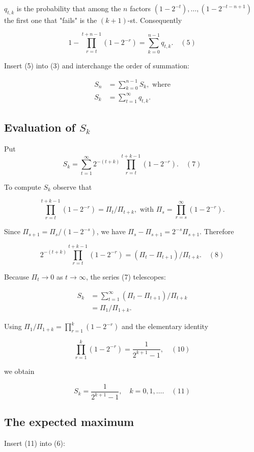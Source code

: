 \documentclass[12pt,a4paper]{article}
\theoremstyle{definition}
\begin{document}
$q_{t,k}$ is the probability that among the $n$ factors $(1 - 2^{-t}), \ldots, (1 - 2^{-t-n+1})$ the first one that "fails" is the $(k+1)$-st.
Consequently

\[
1 - \prod_{r=t}^{t+n-1}(1 - 2^{-r}) = \sum_{k=0}^{n-1} q_{t,k}. \quad {(5)}
\]

Insert (5) into (3) and interchange the order of summation:

\begin{align}
S_n &= \sum_{k=0}^{n-1} S_k, \text{ where} \\
S_k &= \sum_{t=1}^{\infty} q_{t,k}. \tag{6}
\end{align}

\subsection*{Evaluation of $S_k$}

Put
\[
S_k = \sum_{t=1}^{\infty} 2^{-(t+k)} \prod_{r=t}^{t+k-1}(1 - 2^{-r}). \quad {(7)}
\]

To compute $S_k$ observe that

\[
\prod_{r=t}^{t+k-1}(1 - 2^{-r}) = \Pi_t / \Pi_{t+k}, \text{ with } \Pi_s = \prod_{r=s}^{\infty}(1 - 2^{-r}).
\]

Since $\Pi_{s+1} = \Pi_s/(1 - 2^{-s})$, we have $\Pi_s - \Pi_{s+1} = 2^{-s} \Pi_{s+1}$.
Therefore

\[
2^{-(t+k)} \prod_{r=t}^{t+k-1}(1 - 2^{-r}) = (\Pi_t - \Pi_{t+1})/\Pi_{t+k}. \quad {(8)}
\]

Because $\Pi_t \to 0$ as $t \to \infty$, the series (7) telescopes:

\begin{align}
S_k &= \sum_{t=1}^{\infty} (\Pi_t - \Pi_{t+1})/\Pi_{t+k} \\
&= \Pi_1/\Pi_{1+k}. \tag{9}
\end{align}

Using $\Pi_1/\Pi_{1+k} = \prod_{r=1}^{k}(1 - 2^{-r})$ and the elementary identity

\[
\prod_{r=1}^{k}(1 - 2^{-r}) = \frac{1}{2^{k+1} - 1}, \quad {(10)}
\]

we obtain

\[
S_k = \frac{1}{2^{k+1} - 1}, \quad k = 0, 1, \ldots. \quad {(11)}
\]

\subsection*{The expected maximum}

Insert (11) into (6):
\end{document}
